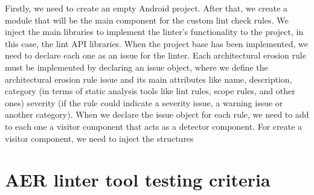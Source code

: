 Firstly, we need to create an empty Android project. After that, we create a module that will be the main component for the custom lint check rules. We inject the main libraries to implement the linter's functionality to the project, in this case, the lint API libraries. When the project base has been implemented, we need to declare each one as an issue for the linter. Each architectural erosion rule must be implemented by declaring an issue object, where we define the architectural erosion rule issue and its main attributes like name, description, category (in terms of static analysis tools like lint rules, scope rules, and other ones) severity (if the rule could indicate a severity issue, a warning issue or another category). When we declare the issue object for each rule, we need to add to each one a visitor component that acts as a detector component. For create a visitor component, we need to inject the structures


\section{AER linter tool testing criteria}